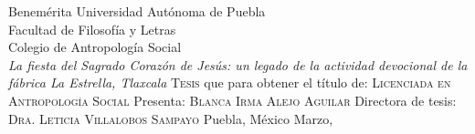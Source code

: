 \documentclass[14pt,letterpaper,twoside]{extbook} %
\begin{document}
\setcounter{page}{1} %
\parindent=5mm %
\parskip=0mm %





\newpage
\pagestyle{empty}
\null\vfill


\pagestyle{empty}
\begin{titlepage}
\begin{center}
\setcounter{page}{3}
\large Benemérita Universidad Autónoma de Puebla\\
\large Facultad de Filosofía y Letras\\
\large Colegio de Antropología Social\\
\vfill
\large {\textit{La fiesta del Sagrado Corazón de Jesús: un legado de la actividad devocional de la fábrica La Estrella, Tlaxcala}}
\vfill 
\large \textsc{Tesis}
\vfill
\large que para obtener el título de:
\vfill
\large \textsc{Licenciada en Antropología Social}
\vfill
\large Presenta:
\vfill
\large \textsc{Blanca Irma Alejo Aguilar}
\vfill
\large Directora de tesis:
\vfill
\large \textsc{Dra. Leticia Villalobos Sampayo}
\vfill
\large Puebla, México \hfill Marzo, 
\end{center}
\end{titlepage}

\newpage
\pagestyle{empty}
\null\vfill

\newpage
\pagestyle{empty}
\null\vfill
\end{document}
